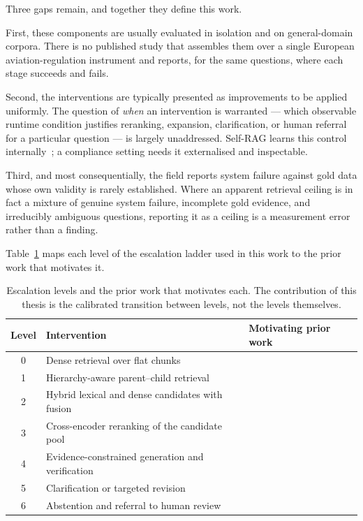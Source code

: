 Three gaps remain, and together they define this work.

First, these components are usually evaluated in isolation and on general-domain corpora. There is no published study that assembles them over a single European aviation-regulation instrument and reports, for the same questions, where each stage succeeds and fails.

Second, the interventions are typically presented as improvements to be applied uniformly. The question of \emph{when} an intervention is warranted --- which observable runtime condition justifies reranking, expansion, clarification, or human referral for a particular question --- is largely unaddressed. Self-RAG learns this control internally~\cite{asai2024selfrag}; a compliance setting needs it externalised and inspectable.

Third, and most consequentially, the field reports system failure against gold data whose own validity is rarely established. Where an apparent retrieval ceiling is in fact a mixture of genuine system failure, incomplete gold evidence, and irreducibly ambiguous questions, reporting it as a ceiling is a measurement error rather than a finding.

Table~\ref{tab:escalation-literature} maps each level of the escalation ladder used in this work to the prior work that motivates it.

\begin{table}[htbp]
  \centering
  \caption{Escalation levels and the prior work that motivates each. The contribution of this thesis is the calibrated transition between levels, not the levels themselves.}
  \label{tab:escalation-literature}
  \small
  \begin{tabularx}{\textwidth}{@{}c l X@{}}
    \toprule
    \textbf{Level} & \textbf{Intervention} & \textbf{Motivating prior work} \\
    \midrule
    0 & Dense retrieval over flat chunks & \cite{lewis2020rag,karpukhin2020dpr} \\
    1 & Hierarchy-aware parent--child retrieval & \cite{chen2024densex,liu2024lostmiddle} \\
    2 & Hybrid lexical and dense candidates with fusion & \cite{robertson2009bm25,cormack2009rrf,bruch2024fusion} \\
    3 & Cross-encoder reranking of the candidate pool & \cite{nogueira2019reranking,nogueira2020monot5,wang2020minilm} \\
    4 & Evidence-constrained generation and verification & \cite{rashkin2023attribution,bohnet2022attributed,gao2023alce} \\
    5 & Clarification or targeted revision & \cite{gao2023rarr} \\
    6 & Abstention and referral to human review & \cite{geifman2017selective,kamath2020selective,magesh2025hallucination} \\
    \bottomrule
  \end{tabularx}
\end{table}

